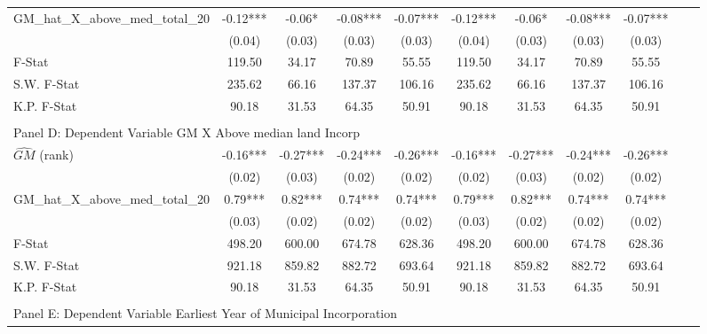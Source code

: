 \begin{table}[htbp]
\begin{threeparttable}
\begin{tabular}{l*{10}{c}}
\addlinespace
GM\_hat\_X\_above\_med\_total\_20&      -0.12***&      -0.06*  &      -0.08***&      -0.07***&      -0.12***&      -0.06*  &      -0.08***&      -0.07***\\
                &     (0.04)   &     (0.03)   &     (0.03)   &     (0.03)   &     (0.04)   &     (0.03)   &     (0.03)   &     (0.03)   \\
\midrule
F-Stat          &     119.50   &      34.17   &      70.89   &      55.55   &     119.50   &      34.17   &      70.89   &      55.55   \\
S.W. F-Stat     &     235.62   &      66.16   &     137.37   &     106.16   &     235.62   &      66.16   &     137.37   &     106.16   \\
K.P. F-Stat     &      90.18   &      31.53   &      64.35   &      50.91   &      90.18   &      31.53   &      64.35   &      50.91   \\
\cmidrule[\heavyrulewidth](lr){1-9} \\ \cmidrule[\heavyrulewidth](lr){1-9}
\multicolumn{8}{l}{Panel D: Dependent Variable GM X Above median land Incorp}\\
\cmidrule(lr){1-9}
$\hat{GM}$ (rank)&      -0.16***&      -0.27***&      -0.24***&      -0.26***&      -0.16***&      -0.27***&      -0.24***&      -0.26***\\
                &     (0.02)   &     (0.03)   &     (0.02)   &     (0.02)   &     (0.02)   &     (0.03)   &     (0.02)   &     (0.02)   \\
\addlinespace
GM\_hat\_X\_above\_med\_total\_20&       0.79***&       0.82***&       0.74***&       0.74***&       0.79***&       0.82***&       0.74***&       0.74***\\
                &     (0.03)   &     (0.02)   &     (0.02)   &     (0.02)   &     (0.03)   &     (0.02)   &     (0.02)   &     (0.02)   \\
\midrule
F-Stat          &     498.20   &     600.00   &     674.78   &     628.36   &     498.20   &     600.00   &     674.78   &     628.36   \\
S.W. F-Stat     &     921.18   &     859.82   &     882.72   &     693.64   &     921.18   &     859.82   &     882.72   &     693.64   \\
K.P. F-Stat     &      90.18   &      31.53   &      64.35   &      50.91   &      90.18   &      31.53   &      64.35   &      50.91   \\
\cmidrule[\heavyrulewidth](lr){1-9} \\ \cmidrule[\heavyrulewidth](lr){1-9}
\multicolumn{8}{l}{Panel E: Dependent Variable Earliest Year of Municipal Incorporation}\\

\end{tabular}
\end{threeparttable}
\end{table}
